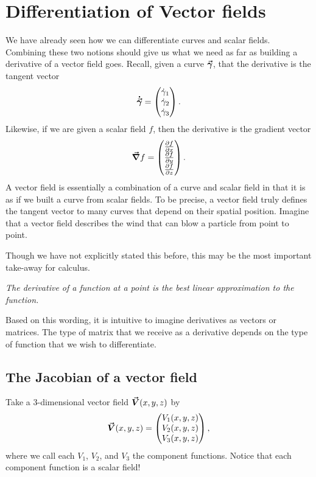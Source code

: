\section{Differentiation of Vector fields}
        We have already seen how we can differentiate curves and scalar fields.  Combining these two notions should give us what we need as far as building a derivative of a vector field goes.  Recall, given a curve $\boldsymbol{\vec{\gamma}}$, that the derivative is the tangent vector
        \[
        \boldsymbol{\dot{\vec{\gamma}}} = \begin{pmatrix} \dot{\gamma}_1 \\ \dot{\gamma}_2 \\ \dot{\gamma}_3 \end{pmatrix}.
        \]
        Likewise, if we are given a scalar field $f$, then the derivative is the gradient vector
        \[
        \boldsymbol{\vec{\nabla}} f = \begin{pmatrix} \frac{\partial f}{\partial x} \\ \frac{\partial f}{\partial y} \\ \frac{\partial f}{\partial z} \end{pmatrix}.
        \]
        A vector field is essentially a combination of a curve and scalar field in that it is as if we built a curve from scalar fields.  To be precise, a vector field truly defines the tangent vector to many curves that depend on their spatial position.  Imagine that a vector field describes the wind that can blow a particle from point to point.


        \begin{remark}
        Though we have not explicitly stated this before, this may be the most important take-away for calculus.

        \emph{The derivative of a function at a point is the best linear approximation to the function.}

        Based on this wording, it is intuitive to imagine derivatives as vectors or matrices. The type of matrix that we receive as a derivative depends on the type of function that we wish to differentiate.
        \end{remark}

\subsection{The Jacobian of a vector field}
		        Take a 3-dimensional vector field $\boldsymbol{\vec{V}}(x,y,z)$ by
		        \[
		        \boldsymbol{\vec{V}}(x,y,z)=\begin{pmatrix} V_1(x,y,z) \\ V_2(x,y,z) \\ V_3(x,y,z)\end{pmatrix},
		        \]
		        where we call each $V_1$, $V_2$, and $V_3$ the component functions.  Notice that each component function is a scalar field!

